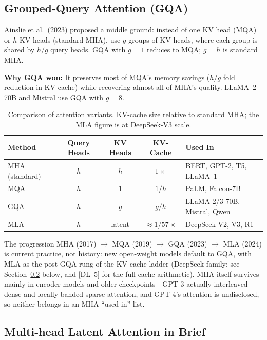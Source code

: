 \subsection{Grouped-Query Attention (GQA)}

Ainslie et al.\ (2023) proposed a middle ground: instead of one KV head
(MQA) or $h$ KV heads (standard MHA), use $g$ groups of KV heads, where each
group is shared by $h/g$ query heads.  GQA with $g = 1$ reduces to MQA;
$g = h$ is standard MHA.

\textbf{Why GQA won:} It preserves most of MQA's memory savings ($h/g$ fold
reduction in KV-cache) while recovering almost all of MHA's quality.  LLaMA~2
70B and Mistral use GQA with $g = 8$.

\begin{table}[H]
\centering
\small
\begin{tabularx}{\textwidth}{@{}l c c c X@{}}
\toprule
\textbf{Method} & \textbf{Query Heads} & \textbf{KV Heads} & \textbf{KV-Cache} & \textbf{Used In} \\
\midrule
MHA (standard)   & $h$  & $h$  & $1\times$                & BERT, GPT-2, T5, LLaMA~1 \\
MQA              & $h$  & $1$  & $1/h$                    & PaLM, Falcon-7B \\
GQA              & $h$  & $g$  & $g/h$                    & LLaMA 2/3 70B, Mistral, Qwen \\
MLA              & $h$  & latent & $\approx 1/57\times$ & DeepSeek V2, V3, R1 \\
\bottomrule
\end{tabularx}
\caption{Comparison of attention variants.  KV-cache size relative to
standard MHA; the MLA figure is at DeepSeek-V3 scale.}
\label{tab:attention-variants}
\end{table}

The progression MHA (2017) $\to$ MQA (2019) $\to$ GQA (2023) $\to$ MLA
(2024) is current practice, not history: new open-weight models default to
GQA, with MLA as the post-GQA rung of the KV-cache ladder (DeepSeek family;
see Section~\ref{sec:mla-brief} below, and [DL~5] for the full cache
arithmetic).  MHA itself survives mainly in encoder models and older
checkpoints---GPT-3 actually interleaved dense and locally banded sparse
attention, and GPT-4's attention is undisclosed, so neither belongs in an
MHA ``used in'' list.

\subsection{Multi-head Latent Attention in Brief}
\label{sec:mla-brief}

